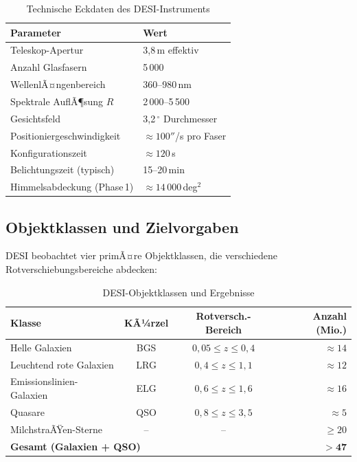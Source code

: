 ﻿\documentclass[a4paper,12pt]{article}
\theoremstyle{definition}
\theoremstyle{remark}
\begin{document}
\begin{table}[H]
  \centering
  \caption{Technische Eckdaten des DESI-Instruments}
  \label{tab:desi_specs}
  \begin{tabular}{ll}
    \toprule
    \textbf{Parameter} & \textbf{Wert} \\
    \midrule
    Teleskop-Apertur & 3{,}8\,m effektiv \\
    Anzahl Glasfasern & 5\,000 \\
    WellenlÃ¤ngenbereich & 360--980\,nm \\
    Spektrale AuflÃ¶sung $R$ & 2\,000--5\,500 \\
    Gesichtsfeld & 3{,}2\,$^\circ$ Durchmesser \\
    Positioniergeschwindigkeit & $\approx 100''$/s pro Faser \\
    Konfigurationszeit & $\approx 120$\,s \\
    Belichtungszeit (typisch) & 15--20\,min \\
    Himmelsabdeckung (Phase\,1) & $\approx 14\,000$\,deg$^2$ \\
    \bottomrule
  \end{tabular}
\end{table}

\subsection{Objektklassen und Zielvorgaben}

DESI beobachtet vier primÃ¤re Objektklassen, die verschiedene Rotverschiebungsbereiche
abdecken:

\begin{table}[H]
  \centering
  \caption{DESI-Objektklassen und Ergebnisse}
  \label{tab:objekte}
  \begin{tabular}{lccr}
    \toprule
    \textbf{Klasse} & \textbf{KÃ¼rzel} & \textbf{Rotversch.-Bereich} & \textbf{Anzahl (Mio.)} \\
    \midrule
    Helle Galaxien & BGS & $0{,}05 \leq z \leq 0{,}4$ & $\approx 14$ \\
    Leuchtend rote Galaxien & LRG & $0{,}4 \leq z \leq 1{,}1$ & $\approx 12$ \\
    Emissionslinien-Galaxien & ELG & $0{,}6 \leq z \leq 1{,}6$ & $\approx 16$ \\
    Quasare & QSO & $0{,}8 \leq z \leq 3{,}5$ & $\approx 5$ \\
    MilchstraÃŸen-Sterne & -- & -- & $\geq 20$ \\
    \bottomrule
    \multicolumn{3}{l}{\textbf{Gesamt (Galaxien + QSO)}} & $\mathbf{> 47}$ \\
    \bottomrule
  \end{tabular}
\end{table}
\end{document}
